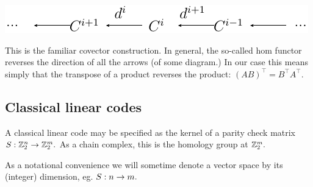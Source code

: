 \begin{center}
\includegraphics{cochain.pdf}
\end{center}

This is the familiar covector construction.
In general, the so-called hom functor reverses the
direction of all the arrows (of some diagram.)
In our case this means simply that the transpose of a
product reverses the product: $(AB)^\top = B^\top A^\top.$

%
%
%


%
%
%
%
%
%


\subsection{Classical linear codes}

A classical linear code may be specified as the
kernel of a parity check matrix $\S:\Z_2^n\to \Z_2^m.$
As a chain complex, this is the homology group at
$\Z_2^m.$

As a notational convenience we will sometime denote
a vector space by its (integer) dimension,
eg. $\S:n\to m.$

\setlength{\tabcolsep}{15pt}

